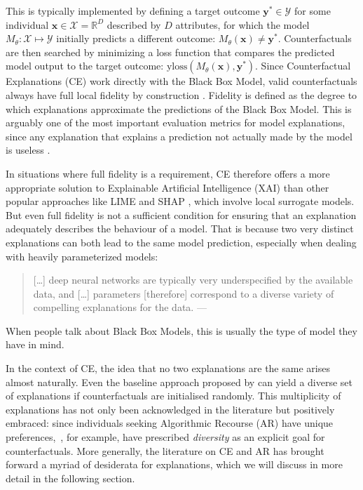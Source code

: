 \documentclass{article}
\begin{document}
This is typically implemented by defining a target outcome $\mathbf{y}^* \in \mathcal{Y}$ for some individual $\mathbf{x} \in \mathcal{X}=\mathbb{R}^D$ described by $D$ attributes, for which the model $M_{\theta}:\mathcal{X}\mapsto\mathcal{Y}$ initially predicts a different outcome: $M_{\theta}(\mathbf{x})\ne \mathbf{y}^*$. Counterfactuals are then searched by minimizing a loss function that compares the predicted model output to the target outcome: $\text{yloss}(M_{\theta}(\mathbf{x}),\mathbf{y}^*)$. Since Counterfactual Explanations (CE) work directly with the Black Box Model, valid counterfactuals always have full local fidelity by construction \citep{mothilal2020explaining}. Fidelity is defined as the degree to which explanations approximate the predictions of the Black Box Model. This is arguably one of the most important evaluation metrics for model explanations, since any explanation that explains a prediction not actually made by the model is useless \citep{molnar2020interpretable}. 

In situations where full fidelity is a requirement, CE therefore offers a more appropriate solution to Explainable Artificial Intelligence (XAI) than other popular approaches like LIME \citep{ribeiro2016why} and SHAP \citep{lundberg2017unified}, which involve local surrogate models. But even full fidelity is not a sufficient condition for ensuring that an explanation adequately describes the behaviour of a model. That is because two very distinct explanations can both lead to the same model prediction, especially when dealing with heavily parameterized models:

\begin{quotation}
  […] deep neural networks are typically very underspecified by the available data, and […] parameters [therefore] correspond to a diverse variety of compelling explanations for the data.
  --- \citet{wilson2020case}
\end{quotation}

When people talk about Black Box Models, this is usually the type of model they have in mind. 

In the context of CE, the idea that no two explanations are the same arises almost naturally. Even the baseline approach proposed by \citet{wachter2017counterfactual} can yield a diverse set of explanations if counterfactuals are initialised randomly. This multiplicity of explanations has not only been acknowledged in the literature but positively embraced: since individuals seeking Algorithmic Recourse (AR) have unique preferences,~\citet{mothilal2020explaining}, for example, have prescribed \textit{diversity} as an explicit goal for counterfactuals. More generally, the literature on CE and AR has brought forward a myriad of desiderata for explanations, which we will discuss in more detail in the following section.
\end{document}
